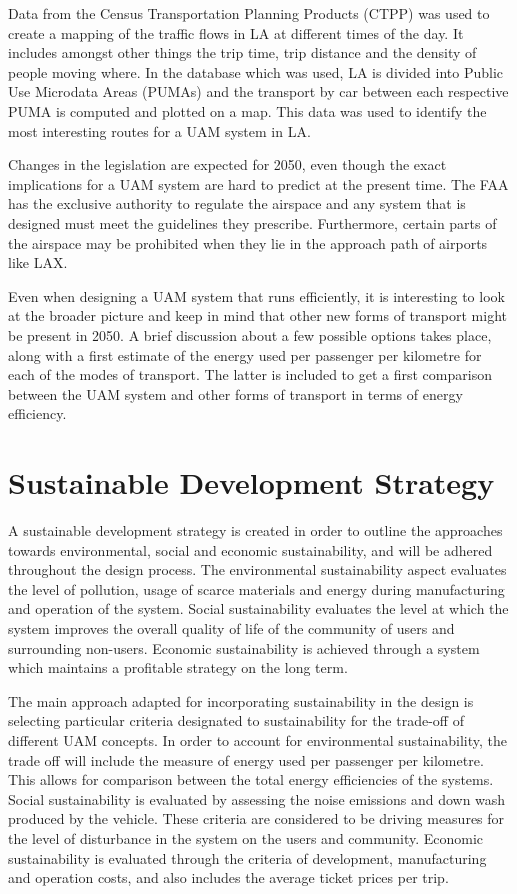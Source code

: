 Data from the Census Transportation Planning Products (CTPP) was used to create a mapping of the traffic flows in LA at different times of the day. It includes amongst other things the trip time, trip distance and the density of people moving where. In the database which was used, LA is divided into Public Use Microdata Areas (PUMAs) and the transport by car between each respective PUMA is computed and plotted on a map. This data was used to identify the most interesting routes for a UAM system in LA. 

Changes in the legislation are expected for 2050, even though the exact implications for a UAM system are hard to predict at the present time. The FAA has the exclusive authority to regulate the airspace and any system that is designed must meet the guidelines they prescribe. Furthermore, certain parts of the airspace may be prohibited when they lie in the approach path of airports like LAX. 

Even when designing a UAM system that runs efficiently, it is interesting to look at the broader picture and keep in mind that other new forms of transport might be present in 2050. A brief discussion about a few possible options takes place, along with a first estimate of the energy used per passenger per kilometre for each of the modes of transport. The latter is included to get a first comparison between the UAM system and other forms of transport in terms of energy efficiency. 

\section{Sustainable Development Strategy}
A sustainable development strategy is created in order to outline the approaches towards environmental, social and economic sustainability, and will be adhered throughout the design process. The environmental sustainability aspect evaluates the level of pollution, usage of scarce materials and energy during manufacturing and operation of the system. Social sustainability evaluates the level at which the system improves the overall quality of life of the community of users and surrounding non-users. Economic sustainability is achieved through a system which maintains a profitable strategy on the long term.

The main approach adapted for incorporating sustainability in the design is selecting particular criteria designated to sustainability for the trade-off of different UAM concepts. In order to account for environmental sustainability, the trade off will include the measure of energy used per passenger per kilometre. This allows for comparison between the total energy efficiencies of the systems. Social sustainability is evaluated by assessing the noise emissions and down wash produced by the vehicle. These criteria are considered to be driving measures for the level of disturbance in the system on the users and community. Economic sustainability is evaluated through the criteria of development, manufacturing and operation costs, and also includes the average ticket prices per trip.



